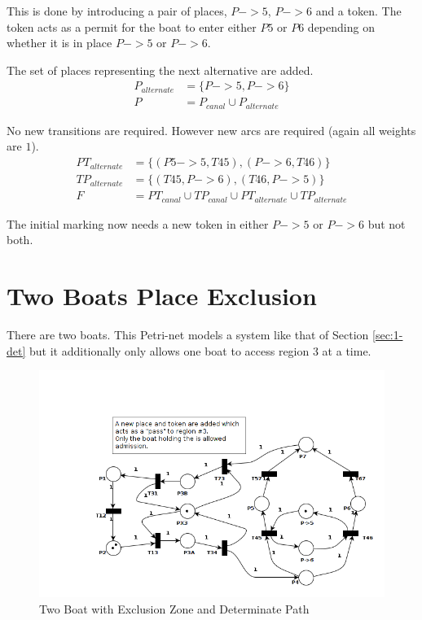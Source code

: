 \documentclass{article}
\begin{document}
This is done by introducing a pair of places,
$P->5$, $P->6$ and a token.
The token acts as a permit for the boat
to enter either $P5$ or $P6$
depending on whether it is in place $P->5$ or $P->6$.


The set of places representing the next alternative are added.
\begin{align}
P_{alternate} & = \{ P->5, P->6 \} \\
P & = P_{canal} \cup P_{alternate}
\end{align}

No new transitions are required.
However new arcs are required (again all weights are $1$).
\begin{align}
PT_{alternate} & = \{ (P5->5, T45), (P->6, T46) \} \\
TP_{alternate} & = \{ (T45, P->6), (T46, P->5) \} \\
F & = PT_{canal} \cup TP_{canal} \cup PT_{alternate} \cup TP_{alternate}
\end{align}

The initial marking now needs a new token in either
$P->5$ or $P->6$ but not both.


\section{Two Boats Place Exclusion} \label{sec:2-excl}

There are two boats.
This Petri-net models a system like that of
Section \ref{sec:1-det} but it additionally
only allows one boat to access region 3 at a time.

\begin{figure}[h!]
\centering
\includegraphics[scale=0.5]{hw6_petri_net_3.png}
\caption{Two Boat with Exclusion Zone and Determinate Path}
\label{fig:pn3}
\end{figure}
\end{document}
